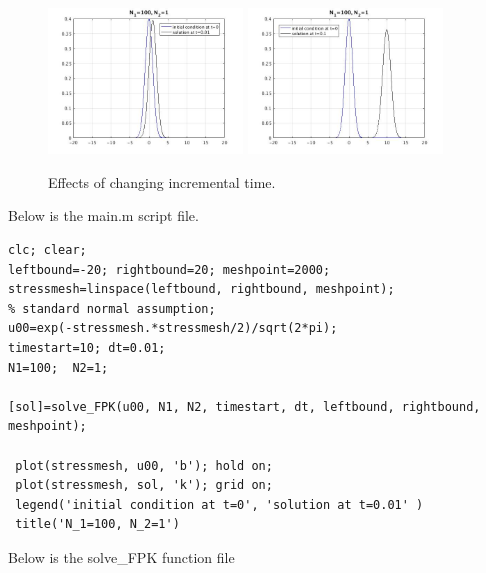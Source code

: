 \documentclass[12pt]{article}
\begin{document}
\begin{figure}[H]
\begin{center}

\includegraphics[width=0.46\textwidth]{norm.jpg} 
\includegraphics[width=0.46\textwidth]{dt01.jpg}  \\
\hspace*{0.2truecm}

\caption{Effects of changing incremental time.} 
\label{fig4}
\end{center}
\end{figure}


Below is the main.m script file.
\begin{lstlisting}
clc; clear;
leftbound=-20; rightbound=20; meshpoint=2000;
stressmesh=linspace(leftbound, rightbound, meshpoint);
% standard normal assumption;
u00=exp(-stressmesh.*stressmesh/2)/sqrt(2*pi); 
timestart=10; dt=0.01;
N1=100;  N2=1;        

[sol]=solve_FPK(u00, N1, N2, timestart, dt, leftbound, rightbound, meshpoint);

 plot(stressmesh, u00, 'b'); hold on;
 plot(stressmesh, sol, 'k'); grid on;
 legend('initial condition at t=0', 'solution at t=0.01' )
 title('N_1=100, N_2=1')

\end{lstlisting}

\vspace{1cm}
Below is the solve\_FPK function file
\end{document}
